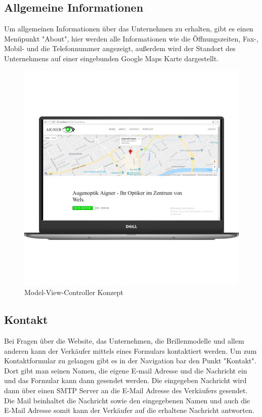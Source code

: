 \subsection{Allgemeine Informationen}
Um allgemeinen Informationen über das Unternehmen zu erhalten, gibt es einen Menüpunkt "About", hier werden alle Informationen wie die Öffnungszeiten, Fax-, Mobil- und die Telefonnummer angezeigt, außerdem wird der Standort des Unternehmens auf einer eingebunden Google Maps Karte dargestellt.

\begin{figure}[H]
\begin{center}
	\includegraphics[scale=.2]{images/About.png}
\end{center}
	\caption{Model-View-Controller Konzept}
	\label{fig:sample}
\end{figure}

\subsection{Kontakt}
Bei Fragen über die Website, das Unternehmen, die Brillenmodelle und allem anderen kann der Verkäufer mittels eines Formulars kontaktiert werden. Um zum Kontaktformular zu gelangen gibt es in der Navigation bar den Punkt "Kontakt". Dort gibt man seinen Namen, die eigene E-mail Adresse und die Nachricht ein und das Formular kann dann gesendet werden. Die eingegeben Nachricht wird dann über einen SMTP Server an die E-Mail Adresse des Verkäufers gesendet. Die Mail beinhaltet die Nachricht sowie den eingegebenen Namen und auch die E-Mail Adresse somit kann der Verkäufer auf die erhaltene Nachricht antworten.

